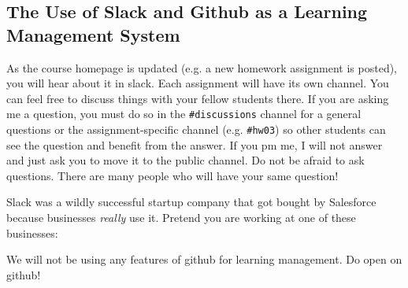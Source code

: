 \subsection*{The Use of Slack and Github as a Learning Management System}

As the course homepage is updated (e.g. a new homework assignment is posted), you will hear about it in slack. Each assignment will have its own channel. You can feel free to discuss things with your fellow students there. If you are asking me a question, you must do so in the \texttt{\#discussions} channel for a general questions or the assignment-specific channel (e.g. \texttt{\#hw03}) so other students can see the question and benefit from the answer. If you pm me, I will not answer and just ask you to move it to the public channel. Do not be afraid to ask questions. There are many people who will have your same question! 

Slack was a wildly successful startup company that got bought by Salesforce because businesses \emph{really} use it. Pretend you are working at one of these businesses:  

We will not be using any features of github for learning management. Do  open  on github! 